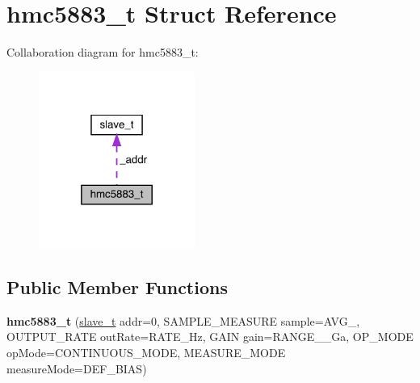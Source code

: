 \hypertarget{structhmc5883__t}{}\section{hmc5883\+\_\+t Struct Reference}
\label{structhmc5883__t}


Collaboration diagram for hmc5883\+\_\+t\+:\nopagebreak
\begin{figure}[H]
\begin{center}
\leavevmode
\includegraphics[width=145pt]{structhmc5883__t__coll__graph}
\end{center}
\end{figure}
\subsection*{Public Member Functions}
\begin{DoxyCompactItemize}
\item 
\mbox{\label{structhmc5883__t_ada60b7eb8c551a11403cac80c69ad222}} 
{\bfseries hmc5883\+\_\+t} (\mbox{\hyperlink{structslave__t}{slave\+\_\+t}} addr=0, S\+A\+M\+P\+L\+E\+\_\+\+M\+E\+A\+S\+U\+RE sample=A\+V\+G\+\_, O\+U\+T\+P\+U\+T\+\_\+\+R\+A\+TE out\+Rate=R\+A\+T\+E\+\_\+Hz, G\+A\+IN gain=R\+A\+N\+G\+E\+\_\+\_\+Ga, O\+P\+\_\+\+M\+O\+DE op\+Mode=C\+O\+N\+T\+I\+N\+U\+O\+U\+S\+\_\+\+M\+O\+DE, M\+E\+A\+S\+U\+R\+E\+\_\+\+M\+O\+DE measure\+Mode=D\+E\+F\+\_\+\+B\+I\+AS)
\end{DoxyCompactItemize}
